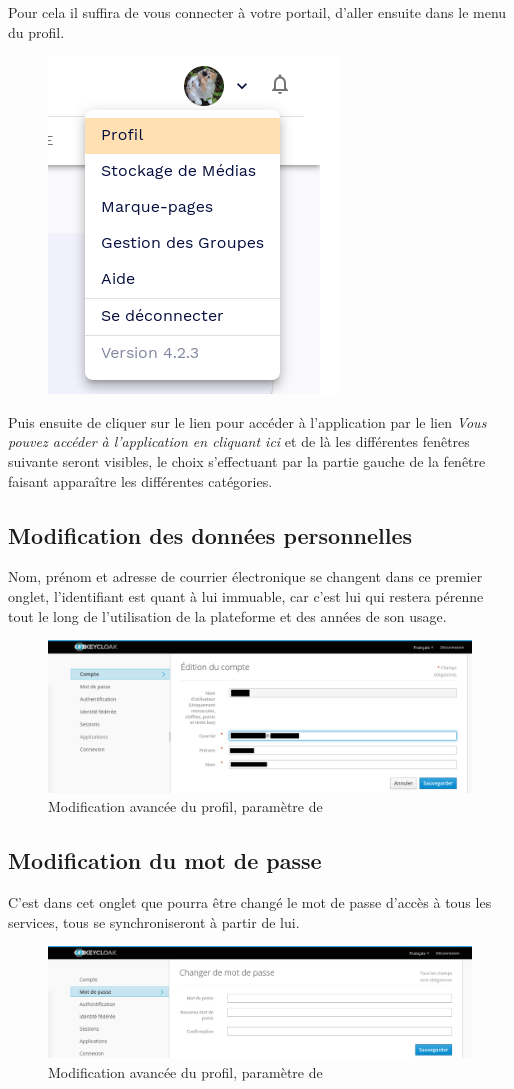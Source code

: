 Pour cela il suffira de vous connecter à votre portail, d'aller ensuite dans le menu du profil.
\begin{figure}
	\centering
	\includegraphics[width=0.3333\linewidth]{./Captures/menu.profil.png}
\end{figure}
Puis ensuite de cliquer sur le lien pour accéder à l'application par le lien \emph{Vous pouvez accéder à l'application en cliquant ici\/} et de là les différentes fenêtres suivante seront visibles, le choix s'effectuant par la partie gauche de la fenêtre faisant apparaître les différentes catégories.

\subsection{Modification des données personnelles}
Nom, prénom et adresse de courrier électronique se changent dans ce premier onglet, l'identifiant est quant à lui immuable, car c'est lui qui restera pérenne tout le long de l'utilisation de la plateforme et des années de son usage.
\begin{figure}
	\centering
	\includegraphics{./Captures/keycloack.profil.compte.png}
	\caption{Modification avancée du profil, paramètre de }
\end{figure}

\subsection{Modification du mot de passe}
C'est dans cet onglet que pourra être changé le mot de passe d'accès à tous les services, tous se synchroniseront à partir de lui.
\begin{figure}
	\centering
	\includegraphics{./Captures/keycloack.profil.mdp.png}
	\caption{Modification avancée du profil, paramètre de }
\end{figure}


